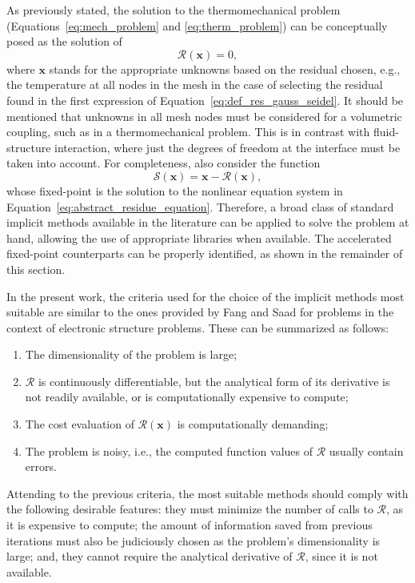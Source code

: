      As previously stated, the solution to the thermomechanical problem (Equations~\eqref{eq:mech_problem} and \eqref{eq:therm_problem}) can be conceptually posed as the solution of
     \begin{equation} \label{eq:abstract_residue_equation}
       \bm{\mathcal{R}}(\mathbf{x}) = 0,
     \end{equation}
     where $\mathbf x$ stands for the appropriate unknowns based on the residual chosen, e.g., the temperature at all nodes in the mesh in the case of selecting the residual found in the first expression of Equation~\eqref{eq:def_res_gauss_seidel}.
     It should be mentioned that unknowns in all mesh nodes must be considered for a volumetric coupling, such as in a thermomechanical problem.
     This is in contrast with fluid-structure interaction, where just the degrees of freedom at the interface must be taken into account.
     For completeness, also consider the function
     \begin{equation}
       \bm{\mathcal{S}}(\mathbf{x}) = \mathbf{x} - \bm{\mathcal{R}}(\mathbf{x}),
     \end{equation}
     whose fixed-point is the solution to the nonlinear equation system in Equation~\eqref{eq:abstract_residue_equation}.
     Therefore, a broad class of standard implicit methods available in the literature can be applied to solve the problem at hand, allowing the use of appropriate libraries when available.
     The accelerated fixed-point counterparts can be properly identified, as shown in the remainder of this section.

     In the present work, the criteria used for the choice of the implicit methods most suitable are similar to the ones provided by Fang and Saad \citep{fang_two_2009} for problems in the context of electronic structure problems.
     These can be summarized as follows:
     \begin{enumerate}
     \item The dimensionality of the problem is large;
     \item \(\bm{\mathcal{R}}\) is continuously differentiable, but the analytical form of its derivative is not readily available, or is computationally expensive to compute;
     \item The cost evaluation of \(\bm{\mathcal{R}}(\mathbf{x})\) is computationally demanding;
     \item The problem is noisy, i.e., the computed function values of \(\bm{\mathcal{R}}\) usually contain errors.
     \end{enumerate}
     Attending to the previous criteria, the most suitable methods should comply with the following desirable features: they must minimize the number of calls to \(\bm{\mathcal{R}}\), as it is expensive to compute; the amount of information saved from previous iterations must also be judiciously chosen as the problem's dimensionality is large; and, they cannot require the analytical derivative of \(\bm{\mathcal{R}}\), since it is not available.

